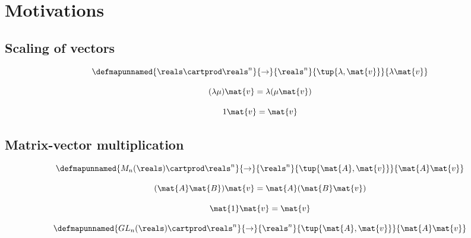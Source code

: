 
\section{Motivations}
\label{sec:simplest-dyn-system}


\subsection{Scaling of vectors}

\begin{equation}
\defmapunnamed{
           \reals \cartprod \reals^n
        }{
           \to
        }{
           \reals^n 
        }{
          \tup{\lambda, \mat{v}}
        }{
          \lambda\mat{v}
          }
\end{equation}


\begin{equation}
 (\lambda \mu)\mat{v} =  \lambda (\mu \mat{v})
\end{equation}

\begin{equation}
 1 \mat{v} = \mat{v}
\end{equation}


\subsection{Matrix-vector multiplication}

\begin{equation}
\defmapunnamed{
           M_n(\reals) \cartprod \reals^n
        }{
           \to
        }{
           \reals^n 
        }{
          \tup{\mat{A}, \mat{v}}
        }{
           \mat{A}\mat{v}
           }
\end{equation}


\begin{equation}
 (\mat{A} \mat{B})\mat{v} =  \mat{A} (\mat{B} \mat{v})
\end{equation}

\begin{equation}
 \mat{1}\mat{v} = \mat{v}
\end{equation}


\begin{equation}
\defmapunnamed{
           GL_n(\reals) \cartprod \reals^n
        }{
           \to
        }{
           \reals^n 
        }{
          \tup{\mat{A}, \mat{v}}
        }{
           \mat{A}\mat{v}
           }
\end{equation}


